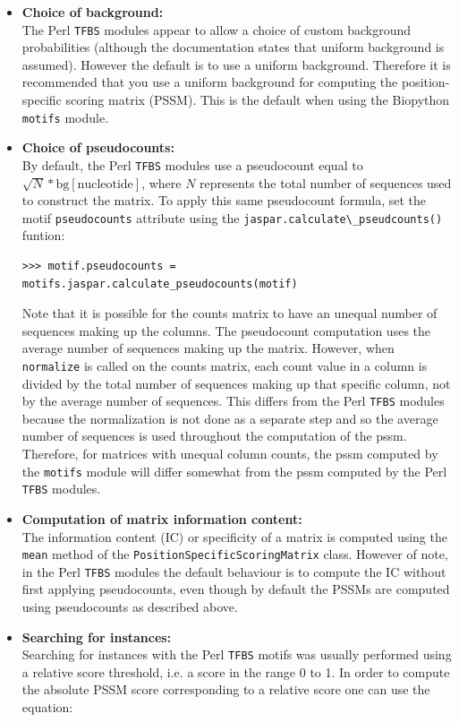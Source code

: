\documentclass{report}
\begin{document}
\begin{itemize}
\item{\bf Choice of background:} \\
The Perl \verb+TFBS+ modules appear to allow a choice of custom background probabilities (although the documentation states that uniform background is assumed). However the default is to use a uniform background. Therefore it is recommended that you use a uniform background for computing the position-specific scoring matrix (PSSM). This is the default when using the Biopython \verb+motifs+ module.
\item{\bf Choice of pseudocounts:} \\
By default, the Perl \verb+TFBS+ modules use a pseudocount equal to $\sqrt{N} * \textrm{bg}[\textrm{nucleotide}]$, where $N$ represents the total number of sequences used to construct the matrix. To apply this same pseudocount formula, set the motif \verb+pseudocounts+ attribute using the \verb+jaspar.calculate\_pseudcounts()+ funtion:
\begin{verbatim}
>>> motif.pseudocounts = motifs.jaspar.calculate_pseudocounts(motif)
\end{verbatim}
Note that it is possible for the counts matrix to have an unequal number of sequences making up the columns. The pseudocount computation uses the average number of sequences making up the matrix. However, when \verb+normalize+ is called on the counts matrix, each count value in a column is divided by the total number of sequences making up that specific column, not by the average number of sequences. This differs from the Perl \verb+TFBS+ modules because the normalization is not done as a separate step and so the average number of sequences is used throughout the computation of the pssm. Therefore, for matrices with unequal column counts, the pssm computed by the \verb+motifs+ module will differ somewhat from the pssm computed by the Perl \verb+TFBS+ modules.
\item{\bf Computation of matrix information content:} \\
The information content (IC) or specificity of a matrix is computed using the \verb+mean+ method of the \verb+PositionSpecificScoringMatrix+ class. However of note, in the Perl \verb+TFBS+ modules the default behaviour is to compute the IC without first applying pseudocounts, even though by default the PSSMs are computed using pseudocounts as described above.
\item{\bf Searching for instances:} \\
Searching for instances with the Perl \verb+TFBS+ motifs was usually performed using a relative score threshold, i.e. a score in the range 0 to 1. In order to compute the absolute PSSM score corresponding to a relative score one can use the equation:

\end{itemize}
\end{document}
